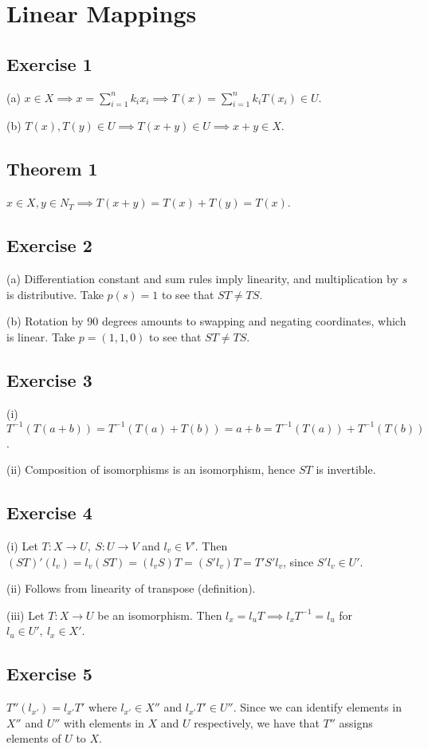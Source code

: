 \section{Linear Mappings}

\subsection{Exercise 1}
(a) $x \in X \implies x = \sum_{i=1}^{n} k_i x_i \implies T(x) = \sum_{i=1}^{n} k_i T(x_i) \in U$.

(b) $T(x), T(y) \in U \implies T(x + y) \in U \implies x + y \in X$.

\subsection*{Theorem 1}
$x \in X, y \in N_T \implies T(x + y) = T(x) + T(y) = T(x)$.

\subsection{Exercise 2}
(a) Differentiation constant and sum rules imply linearity, and multiplication by $s$ is distributive.
Take $p(s) = 1$ to see that $ST \neq TS$.

(b) Rotation by 90 degrees amounts to swapping and negating coordinates, which is linear.
Take $p = (1, 1, 0)$ to see that $ST \neq TS$.

\subsection{Exercise 3}
(i) $T^{-1} (T(a + b)) = T^{-1} (T(a) + T(b)) = a + b = T^{-1} (T(a)) + T^{-1} (T(b))$.

(ii) Composition of isomorphisms is an isomorphism, hence $ST$ is invertible.

\subsection{Exercise 4}
(i) Let $T: X \to U,\: S: U \to V$ and $l_v \in V'$. 
Then $(ST)' (l_v) = l_v (ST) = (l_v S) T = (S' l_v) T = T' S' l_v$,
since $S' l_v \in U'$. 

(ii) Follows from linearity of transpose (definition).

(iii) Let $T: X \to U$ be an isomorphism. Then $l_x = l_u T \implies l_x T^{-1} = l_u$
for $l_u \in U', \: l_x \in X'$.

\subsection{Exercise 5}
$T''(l_{x'}) = l_{x'}T'$ where $l_{x'} \in X''$ and $l_{x'}T' \in U''$.
Since we can identify elements in $X''$ and $U''$ with elements in $X$ and $ U$
respectively, we have that $T''$ assigns elements of $U$ to $X$.

